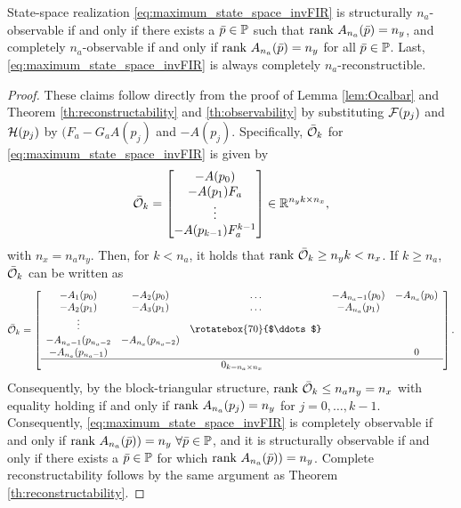 \begin{corollary}
    State-space realization \eqref{eq:maximum_state_space_invFIR} is structurally $n_a$-observable if and only if there exists a $\bar{p}\in\mathbb{P}$ such that $\textrm{rank}\ A_{n_a}(\bar{p}) = n_y$, and completely $n_a$-observable if and only if $\textrm{rank}\ A_{n_a}(\bar{p}) = n_y$ for all $\bar{p}\in\mathbb{P}$. Last, \eqref{eq:maximum_state_space_invFIR} is always completely $n_a$-reconstructible.
    \end{corollary}
\begin{proof}
    These claims follow directly from the proof of Lemma \ref{lem:Ocalbar} and Theorem \ref{th:reconstructability} and \ref{th:observability} by substituting $\mathcal{F}(p_j)$ and $\mathcal{H}(p_j)$ by $(F_a - G_a A(p_j)$ and $-A(p_j)$. Specifically, $\bar{\mathcal{O}}_k$ for \eqref{eq:maximum_state_space_invFIR} is given by
    \begin{equation}
        \bar{\mathcal{O}}_k = \begin{bmatrix}
            -A(p_0) \\
            -A(p_1) F_a \\
            \vdots \\
            -A(p_{k-1}) F_a^{k-1}            
        \end{bmatrix} \in \mathbb{R}^{n_y k \times n_x},
    \end{equation}
    with $n_x = n_a n_y$. Then, for $k < n_a$, it holds that $\textrm{rank}\ \bar{\mathcal{O}}_k \geq n_y k < n_x $. If $k \geq n_a$, $\bar{\mathcal{O}}_k$ can be written as
    \begin{equation}
        \bar{\Ocal}_k = \left[\begin{array}{ccccc}
            -A_1(p_0) & -A_2(p_0) & \hdots & -A_{n_a-1}(p_0) & -A_{n_a}(p_0) \\
            -A_2(p_1) & -A_3(p_1) & \hdots & -A_{n_a}(p_1) &  \\
            \vdots & & \raisebox{-3pt}{\rotatebox{70}{$\ddots$}} & & \\
            -A_{n_a-1}(p_{n_a-2} & -A_{n_a}(p_{n_a-2}) & & & \\
            -A_{n_a}(p_{n_a-1}) & & & & 0 \\
            \hline
            \multicolumn{5}{c}{0_{k - n_a \times n_x}}
        \end{array}\right].
    \end{equation}
    Consequently, by the block-triangular structure, $\rank\ \bar{\Ocal}_k \leq n_a n_y = n_x$ with equality holding if and only if $\textrm{rank}\ A_{n_a}(p_j) = n_y$ for $j=0,\ldots,k-1$. Consequently,  \eqref{eq:maximum_state_space_invFIR} is completely observable if and only if $\textrm{rank}\ A_{n_a}(\bar{p})) = n_y \ \forall \bar{p}\in\mathbb{P}$, and it is structurally observable if and only if there exists a $\bar{p} \in \mathbb{P}$ for which $\textrm{rank}\ A_{n_a}(\bar{p})) = n_y$. Complete reconstructability follows by the same argument as Theorem \ref{th:reconstructability}.
\end{proof}
